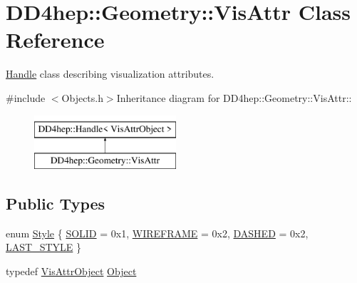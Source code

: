 \hypertarget{class_d_d4hep_1_1_geometry_1_1_vis_attr}{
\section{DD4hep::Geometry::VisAttr Class Reference}
\label{class_d_d4hep_1_1_geometry_1_1_vis_attr}
}


\hyperlink{class_d_d4hep_1_1_handle}{Handle} class describing visualization attributes.  


{\ttfamily \#include $<$Objects.h$>$}Inheritance diagram for DD4hep::Geometry::VisAttr::\begin{figure}[H]
\begin{center}
\leavevmode
\includegraphics[height=2cm]{class_d_d4hep_1_1_geometry_1_1_vis_attr}
\end{center}
\end{figure}
\subsection*{Public Types}
\begin{DoxyCompactItemize}
\item 
enum \hyperlink{class_d_d4hep_1_1_geometry_1_1_vis_attr_a6b393ca7e14c69cf689ce7274f8a7630}{Style} \{ \hyperlink{class_d_d4hep_1_1_geometry_1_1_vis_attr_a6b393ca7e14c69cf689ce7274f8a7630abb85e6313ec27720fcbae236740dd4c9}{SOLID} =  0x1, 
\hyperlink{class_d_d4hep_1_1_geometry_1_1_vis_attr_a6b393ca7e14c69cf689ce7274f8a7630a0d68594c8595d3e08905204dc4262e4e}{WIREFRAME} =  0x2, 
\hyperlink{class_d_d4hep_1_1_geometry_1_1_vis_attr_a6b393ca7e14c69cf689ce7274f8a7630af20eddb2bef47dfd54509f51e7d8459a}{DASHED} =  0x2, 
\hyperlink{class_d_d4hep_1_1_geometry_1_1_vis_attr_a6b393ca7e14c69cf689ce7274f8a7630ac717929c78b2fc60a604e7dd0a09c419}{LAST\_\-STYLE}
 \}
\item 
typedef \hyperlink{class_d_d4hep_1_1_geometry_1_1_vis_attr_object}{VisAttrObject} \hyperlink{class_d_d4hep_1_1_geometry_1_1_vis_attr_a8c2a1708a4161f27aed36d464be316cc}{Object}
\end{DoxyCompactItemize}
